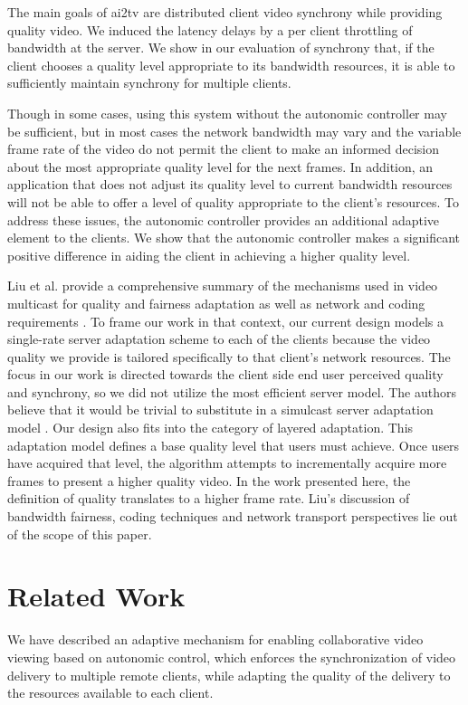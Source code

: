 \documentclass{sig-alternate}
\begin{document}
The main goals of ai2tv are distributed client video synchrony while
providing quality video.  We induced the latency delays by a per
client throttling of bandwidth at the server.  We show in our
evaluation of synchrony that, if the client chooses a quality level
appropriate to its bandwidth resources, it is able to sufficiently
maintain synchrony for multiple clients.

Though in some cases, using this system without the autonomic
controller may be sufficient, but in most cases the network bandwidth
may vary and the variable frame rate of the video do not permit the
client to make an informed decision about the most appropriate quality
level for the next frames.  In addition, an application that does not
adjust its quality level to current bandwidth resources will not be
able to offer a level of quality appropriate to the client's
resources.  To address these issues, the autonomic controller provides
an additional adaptive element to the clients.  We show that the
autonomic controller makes a significant positive difference in aiding
the client in achieving a higher quality level.

Liu et al. provide a comprehensive summary of the mechanisms used in
video multicast for quality and fairness adaptation as well as network
and coding requirements \cite{LIU}.  To frame our work in that
context, our current design models a single-rate server adaptation
scheme to each of the clients because the video quality we provide is
tailored specifically to that client's network resources.  The focus
in our work is directed towards the client side end user perceived
quality and synchrony, so we did not utilize the most efficient server
model.  The authors believe that it would be trivial to substitute in
a simulcast server adaptation model \cite{simulcast}.  Our design also
fits into the category of layered adaptation.  This adaptation model
defines a base quality level that users must achieve.  Once users have
acquired that level, the algorithm attempts to incrementally acquire
more frames to present a higher quality video.  In the work presented
here, the definition of quality translates to a higher frame rate.
Liu's discussion of bandwidth fairness, coding techniques and network
transport perspectives lie out of the scope of this paper.

\section{Related Work} \label{related}
We have described an adaptive mechanism for enabling collaborative video viewing
based on autonomic control,
which enforces the synchronization
of video delivery to multiple remote clients, while adapting the quality of
the delivery to the resources available to each client.
\end{document}
